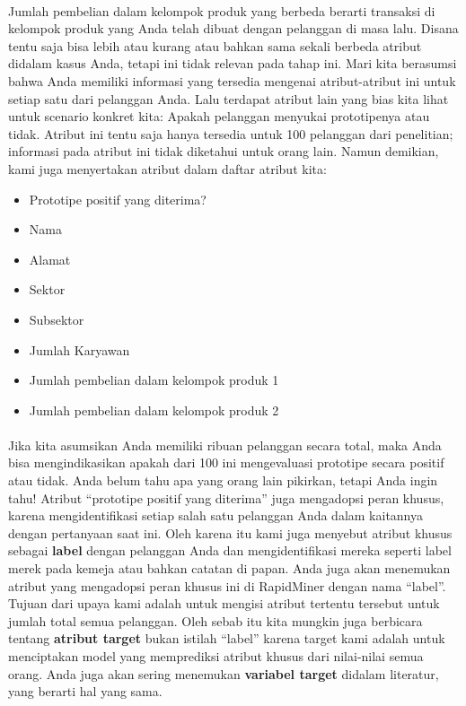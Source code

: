 \paragraph{} Jumlah pembelian dalam kelompok produk yang berbeda berarti transaksi di kelompok produk yang Anda telah dibuat dengan pelanggan di masa lalu. Disana tentu saja bisa lebih atau kurang atau bahkan sama sekali berbeda atribut didalam kasus Anda, tetapi ini tidak relevan pada tahap ini. Mari kita berasumsi bahwa Anda memiliki informasi yang tersedia mengenai atribut-atribut ini untuk setiap satu dari pelanggan Anda. Lalu terdapat atribut lain yang bias kita lihat untuk scenario konkret kita: Apakah pelanggan menyukai prototipenya atau tidak. Atribut ini tentu saja hanya tersedia untuk 100 pelanggan dari penelitian; informasi pada atribut ini tidak diketahui untuk orang lain. Namun demikian, kami juga menyertakan atribut dalam daftar atribut kita:

\begin{itemize}
    \item 	Prototipe positif yang diterima?
 \item	Nama 
 \item	Alamat 
 \item	Sektor 
 \item	Subsektor 
 \item	Jumlah Karyawan 
 \item	Jumlah pembelian dalam kelompok produk 1 
 \item	Jumlah pembelian dalam kelompok produk 2

\end{itemize}

\paragraph{} Jika kita asumsikan Anda memiliki ribuan pelanggan secara total, maka Anda bisa mengindikasikan apakah dari 100 ini mengevaluasi prototipe secara positif atau tidak. Anda belum tahu apa yang orang lain pikirkan, tetapi Anda ingin tahu! Atribut “prototipe positif yang diterima” juga mengadopsi peran khusus, karena mengidentifikasi setiap salah satu pelanggan Anda dalam kaitannya dengan pertanyaan saat ini. Oleh karena itu kami juga menyebut atribut khusus sebagai \textbf{label} dengan pelanggan Anda dan mengidentifikasi mereka seperti label merek pada kemeja atau bahkan catatan di papan. Anda juga akan menemukan atribut yang mengadopsi peran khusus ini di RapidMiner dengan nama “label”. Tujuan dari upaya kami adalah untuk mengisi atribut tertentu tersebut untuk jumlah total semua pelanggan. Oleh sebab itu kita mungkin juga berbicara tentang \textbf{atribut target }bukan istilah “label” karena target kami adalah untuk menciptakan model yang memprediksi atribut khusus dari nilai-nilai semua orang. Anda juga akan sering menemukan\textbf{ variabel target} didalam literatur, yang berarti hal yang sama.

